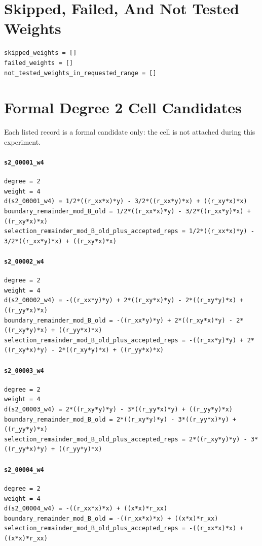 \documentclass[11pt]{article}
\begin{document}
\section*{Skipped, Failed, And Not Tested Weights}
\begin{verbatim}
skipped_weights = []
failed_weights = []
not_tested_weights_in_requested_range = []
\end{verbatim}
\section*{Formal Degree 2 Cell Candidates}
Each listed record is a formal candidate only: the cell is not attached during this experiment.
\paragraph{\texttt{s2\_00001\_w4}}
\begin{verbatim}
degree = 2
weight = 4
d(s2_00001_w4) = 1/2*((r_xx*x)*y) - 3/2*((r_xx*y)*x) + ((r_xy*x)*x)
boundary_remainder_mod_B_old = 1/2*((r_xx*x)*y) - 3/2*((r_xx*y)*x) + ((r_xy*x)*x)
selection_remainder_mod_B_old_plus_accepted_reps = 1/2*((r_xx*x)*y) - 3/2*((r_xx*y)*x) + ((r_xy*x)*x)
\end{verbatim}
\paragraph{\texttt{s2\_00002\_w4}}
\begin{verbatim}
degree = 2
weight = 4
d(s2_00002_w4) = -((r_xx*y)*y) + 2*((r_xy*x)*y) - 2*((r_xy*y)*x) + ((r_yy*x)*x)
boundary_remainder_mod_B_old = -((r_xx*y)*y) + 2*((r_xy*x)*y) - 2*((r_xy*y)*x) + ((r_yy*x)*x)
selection_remainder_mod_B_old_plus_accepted_reps = -((r_xx*y)*y) + 2*((r_xy*x)*y) - 2*((r_xy*y)*x) + ((r_yy*x)*x)
\end{verbatim}
\paragraph{\texttt{s2\_00003\_w4}}
\begin{verbatim}
degree = 2
weight = 4
d(s2_00003_w4) = 2*((r_xy*y)*y) - 3*((r_yy*x)*y) + ((r_yy*y)*x)
boundary_remainder_mod_B_old = 2*((r_xy*y)*y) - 3*((r_yy*x)*y) + ((r_yy*y)*x)
selection_remainder_mod_B_old_plus_accepted_reps = 2*((r_xy*y)*y) - 3*((r_yy*x)*y) + ((r_yy*y)*x)
\end{verbatim}
\paragraph{\texttt{s2\_00004\_w4}}
\begin{verbatim}
degree = 2
weight = 4
d(s2_00004_w4) = -((r_xx*x)*x) + ((x*x)*r_xx)
boundary_remainder_mod_B_old = -((r_xx*x)*x) + ((x*x)*r_xx)
selection_remainder_mod_B_old_plus_accepted_reps = -((r_xx*x)*x) + ((x*x)*r_xx)
\end{verbatim}
\end{document}
